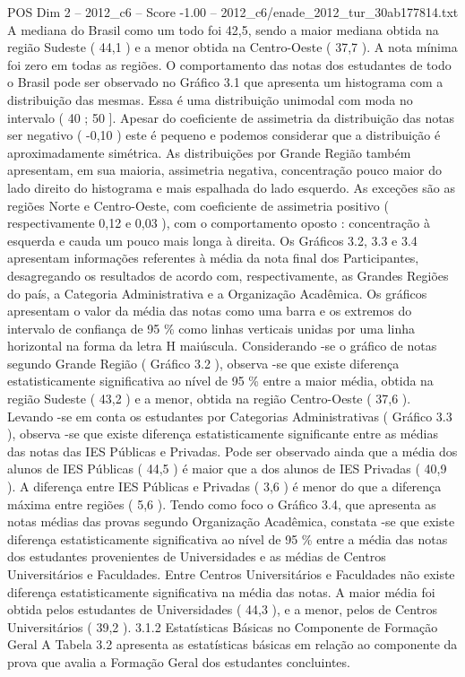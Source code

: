 \begin{textsample}{POS Dim 2 – 2012\_c6 – Score -1.00 – 2012\_c6/enade\_2012\_tur\_30ab177814.txt}
A mediana do Brasil como um todo foi 42,5, sendo a maior mediana obtida na região Sudeste ( 44,1 ) e a menor obtida na Centro-Oeste ( 37,7 ).
A nota mínima foi zero em todas as regiões.
O comportamento das notas dos estudantes de todo o Brasil pode ser observado no Gráfico 3.1 que apresenta um histograma com a distribuição das mesmas.
Essa é uma distribuição unimodal com moda no intervalo ( 40 ; 50 ].
Apesar do coeficiente de assimetria da distribuição das notas ser negativo ( -0,10 ) este é pequeno e podemos considerar que a distribuição é aproximadamente simétrica.
As distribuições por Grande Região também apresentam, em sua maioria, assimetria negativa, concentração pouco maior do lado direito do histograma e mais espalhada do lado esquerdo.
As exceções são as regiões Norte e Centro-Oeste, com coeficiente de assimetria positivo ( respectivamente 0,12 e 0,03 ), com o comportamento oposto : concentração à esquerda e cauda um pouco mais longa à direita.
Os Gráficos 3.2, 3.3 e 3.4 apresentam informações referentes à média da nota final dos Participantes, desagregando os resultados de acordo com, respectivamente, as Grandes Regiões do país, a Categoria Administrativa e a Organização Acadêmica.
Os gráficos apresentam o valor da média das notas como uma barra e os extremos do intervalo de confiança de 95 \% como linhas verticais unidas por uma linha horizontal na forma da letra H maiúscula.
Considerando -se o gráfico de notas segundo Grande Região ( Gráfico 3.2 ), observa -se que existe diferença estatisticamente significativa ao nível de 95 \% entre a maior média, obtida na região Sudeste ( 43,2 ) e a menor, obtida na região Centro-Oeste ( 37,6 ).
Levando -se em conta os estudantes por Categorias Administrativas ( Gráfico 3.3 ), observa -se que existe diferença estatisticamente significante entre as médias das notas das IES Públicas e Privadas.
Pode ser observado ainda que a média dos alunos de IES Públicas ( 44,5 ) é maior que a dos alunos de IES Privadas ( 40,9 ).
A diferença entre IES Públicas e Privadas ( 3,6 ) é menor do que a diferença máxima entre regiões ( 5,6 ).
Tendo como foco o Gráfico 3.4, que apresenta as notas médias das provas segundo Organização Acadêmica, constata -se que existe diferença estatisticamente significativa ao nível de 95 \% entre a média das notas dos estudantes provenientes de Universidades e as médias de Centros Universitários e Faculdades.
Entre Centros Universitários e Faculdades não existe diferença estatisticamente significativa na média das notas.
A maior média foi obtida pelos estudantes de Universidades ( 44,3 ), e a menor, pelos de Centros Universitários ( 39,2 ). 3.1.2 Estatísticas Básicas no Componente de Formação Geral A Tabela 3.2 apresenta as estatísticas básicas em relação ao componente da prova que avalia a Formação Geral dos estudantes concluintes.

\end{textsample}
